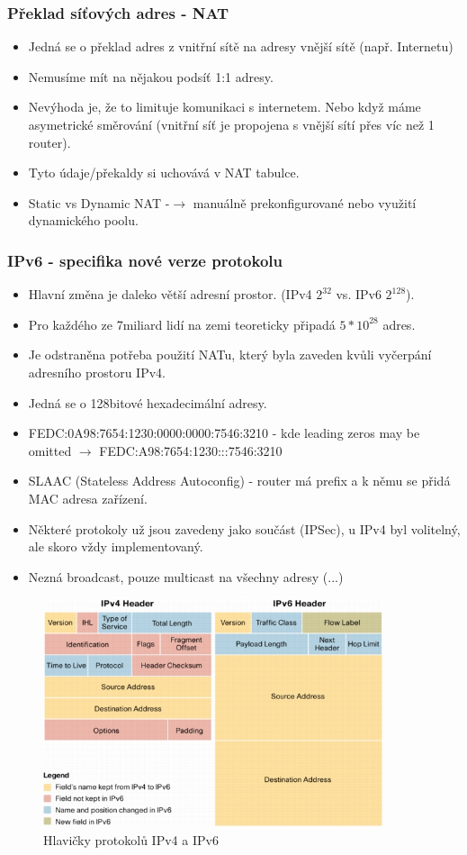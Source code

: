 \documentclass[10pt,a4paper]{article}
\begin{document}
\subsubsection{Překlad síťových adres - NAT}
\begin{itemize}
\item Jedná se o překlad adres z vnitřní sítě na adresy vnější sítě (např. Internetu)
\item Nemusíme mít na nějakou podsíť 1:1 adresy.
\item Nevýhoda je, že to limituje komunikaci s internetem. Nebo když máme asymetrické směrování (vnitřní síť je propojena s vnější sítí přes víc než 1 router).
\item Tyto údaje/překaldy si uchovává v NAT tabulce.
\item Static vs Dynamic NAT -$\rightarrow$ manuálně prekonfigurované nebo využití dynamického poolu.
\end{itemize}

\subsubsection{IPv6 - specifika nové verze protokolu}
\begin{itemize}
\item Hlavní změna je daleko větší adresní prostor. (IPv4 $2^{32}$ vs. IPv6 $2^{128}$).
\item Pro každého ze 7miliard lidí na zemi teoreticky připadá $5*10^{28}$ adres.
\item Je odstraněna potřeba použití NATu, který byla zaveden kvůli vyčerpání adresního prostoru IPv4.
\item Jedná se o 128bitové hexadecimální adresy.
\item FEDC:0A98:7654:1230:0000:0000:7546:3210 - kde leading zeros may be omitted $\rightarrow$ FEDC:A98:7654:1230:::7546:3210
\item SLAAC (Stateless Address Autoconfig) - router má prefix a k němu se přidá MAC adresa zařízení.
\item Některé protokoly už jsou zavedeny jako součást (IPSec), u IPv4 byl volitelný, ale skoro vždy implementovaný.
\item Nezná broadcast, pouze multicast na všechny adresy (...)
\end{itemize}
\begin{figure}[ht]
    \centering
    \includegraphics[width=10cm]{ipv6.jpg}
    \caption{Hlavičky protokolů IPv4 a IPv6}
    \label{fig:ipHeaders}
\end{figure}
\end{document}
